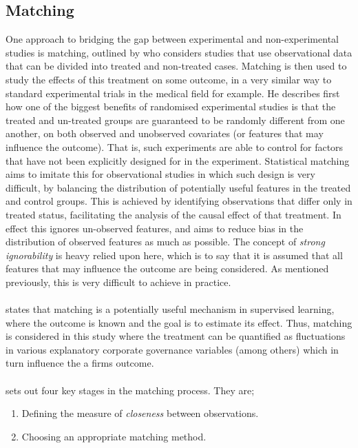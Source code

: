 \subsection{Matching}\label{matching}
{One approach to bridging the gap between experimental and non-experimental studies is matching, outlined by \cite{stuart2010matching} who considers studies that use observational data that can be divided into treated and non-treated cases. Matching is then used to study the effects of this treatment on some outcome, in a very similar way to standard experimental trials in the medical field for example. He describes first how one of the biggest benefits of randomised experimental studies is that the treated and un-treated groups are guaranteed to be randomly different from one another, on both observed and unobserved covariates (or features that may influence the outcome). That is, such experiments are able to control for factors that have not been explicitly designed for in the experiment. Statistical matching aims to imitate this for observational studies in which such design is very difficult, by balancing the distribution of potentially useful features in the treated and control groups. This is achieved by identifying observations that differ only in treated status, facilitating the analysis of the causal effect of that treatment. In effect this ignores un-observed features, and aims to reduce bias in the distribution of observed features as much as possible. The concept of {\it strong ignorability} is heavy relied upon here, which is to say that it is assumed that all features that may influence the outcome are being considered. As mentioned previously, this is very difficult to achieve in practice. \\\\
\cite {stuart2010matching} states that matching is a potentially useful mechanism in supervised learning, where the outcome is known and the goal is to estimate its effect. Thus, matching is considered in this study where the treatment can be quantified as fluctuations in various explanatory corporate governance variables (among others) which in turn influence the a firms outcome. \\\\
\cite {stuart2010matching} sets out four key stages in the matching process. They are;
\begin {enumerate}
\item{Defining the measure of {\it closeness} between observations.}
\item{Choosing an appropriate matching method.}

\end{enumerate}}
